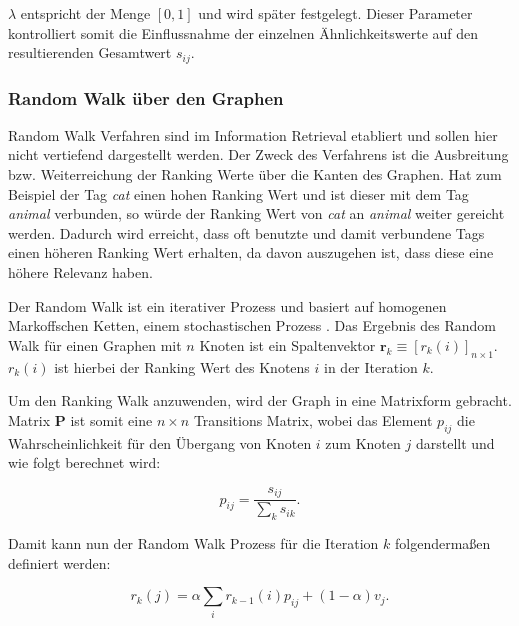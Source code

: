 $\lambda$ entspricht der Menge $[0,1]$ und wird später festgelegt. Dieser Parameter kontrolliert somit die Einflussnahme der einzelnen Ähnlichkeitswerte auf den resultierenden Gesamtwert $s_{ij}$.




\subsubsection{Random Walk über den Graphen} %
\label{ssub:random_walk_ueber_den_graphen}
Random Walk Verfahren sind im Information Retrieval etabliert und sollen hier nicht vertiefend dargestellt werden. Der Zweck des Verfahrens ist die Ausbreitung bzw. Weiterreichung der Ranking Werte über die Kanten des Graphen. Hat zum Beispiel der Tag \emph{cat} einen hohen Ranking Wert und ist dieser mit dem Tag \emph{animal} verbunden, so würde der Ranking Wert von \emph{cat} an \emph{animal} weiter gereicht werden. Dadurch wird erreicht, dass oft benutzte und damit verbundene Tags einen höheren Ranking Wert erhalten, da davon auszugehen ist, dass diese eine höhere Relevanz haben.

Der Random Walk ist ein iterativer Prozess und basiert auf homogenen Markoffschen Ketten, einem stochastischen Prozess \cite{bronstein}. Das Ergebnis des Random Walk für einen Graphen mit $n$ Knoten ist ein Spaltenvektor $\textbf{r}_k \equiv [r_k(i)]_{n \times 1}$. $r_k(i)$ ist hierbei der Ranking Wert des Knotens $i$ in der Iteration $k$. 

Um den Ranking Walk anzuwenden, wird der Graph in eine Matrixform gebracht. Matrix \textbf{P} ist somit eine $n \times n$ Transitions Matrix, wobei das Element $p_{ij}$ die Wahrscheinlichkeit für den Übergang von Knoten $i$ zum Knoten $j$ darstellt und wie folgt berechnet wird:
\begin{figure}[hptb]
  \begin{equation}
  \label{fig:probabilityScore}
    p_{ij} = \frac{s_{ij}}{\sum_k s_{ik}}.
  \end{equation}
\end{figure}

Damit kann nun der Random Walk Prozess für die Iteration $k$ folgendermaßen definiert werden:
\begin{figure}[hptb]
  \begin{equation}
  \label{fig:randomWalk}
    r_k(j) = \alpha \sum_i r_{k-1}(i)p_{ij} + (1 - \alpha)v_j.
  \end{equation}
\end{figure}

